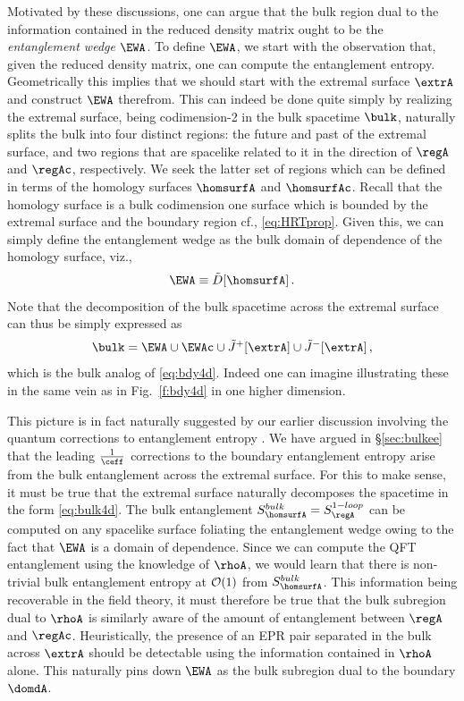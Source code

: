 \documentclass[12pt,openany]{book}
\begin{document}
Motivated by these discussions, one can  argue that the bulk region dual to the information contained in the reduced density matrix ought to be the \emph{entanglement wedge} $\EWA$. To define $\EWA$, we start with the observation that, given  the reduced density matrix, one can compute the entanglement entropy. Geometrically this implies that we should start with the extremal surface $\extrA$ and construct $\EWA$ therefrom. This can indeed be done quite simply by realizing the extremal surface, being codimension-2 in the bulk spacetime $\bulk$, naturally splits the bulk into four distinct regions: the future and past of the extremal surface, and two regions that are spacelike related to it in the direction of $\regA$ and $\regAc$,  respectively. We seek the latter set of regions which can be defined in terms of the homology surfaces $\homsurfA$ and $\homsurfAc$. Recall that the homology surface is a bulk codimension one surface which is bounded by the extremal surface and the boundary region cf., \eqref{eq:HRTprop}. Given this, we can simply define the entanglement wedge as the bulk domain of dependence of the homology surface, viz.,
%
\begin{equation}
\EWA \equiv \tilde{D}[\homsurfA] \,.
\label{eq:ewedge}
\end{equation}
%
Note that the decomposition of the bulk spacetime across the extremal surface can thus be simply expressed as
%
\begin{equation}
\bulk =  \EWA \cup \EWAc  \cup \tilde{J}^+[\extrA] \cup \tilde{J}^-[\extrA] \,,
\label{eq:bulk4d}
\end{equation}
%
 which is the bulk analog of \eqref{eq:bdy4d}. Indeed one can imagine illustrating these in the same vein as in Fig.~\ref{f:bdy4d} in one higher dimension.

 This picture is in fact naturally suggested by our earlier discussion involving the quantum corrections to entanglement entropy \cite{Faulkner:2013ana}. We have argued in \S\ref{sec:bulkee} that the leading $\frac{1}{\ceff} $ corrections to the boundary entanglement entropy arise from the bulk entanglement across the extremal surface. For this to make sense, it must be true that the extremal surface naturally decomposes the spacetime in the form \eqref{eq:bulk4d}. The bulk entanglement $S_{\homsurfA}^{bulk}  = S_\regA^{1-loop}$ can be computed on any spacelike surface foliating the entanglement wedge owing to the fact that $\EWA$ is a domain of dependence.  Since we can compute the QFT entanglement using the knowledge of $\rhoA$, we would learn that there is  non-trivial bulk entanglement entropy at
 ${\cal O}(1)$ from $S_{\homsurfA}^{bulk} $. This information being recoverable in the field theory, it must therefore be true that the bulk subregion dual to $\rhoA$ is similarly aware of the amount of entanglement between $\regA$ and $\regAc$. Heuristically, the presence of an EPR pair separated in the bulk across $\extrA$ should be detectable using the information contained in $\rhoA$ alone. This naturally pins down $\EWA$ as the bulk subregion dual to the boundary
 $\domdA$.
\end{document}
